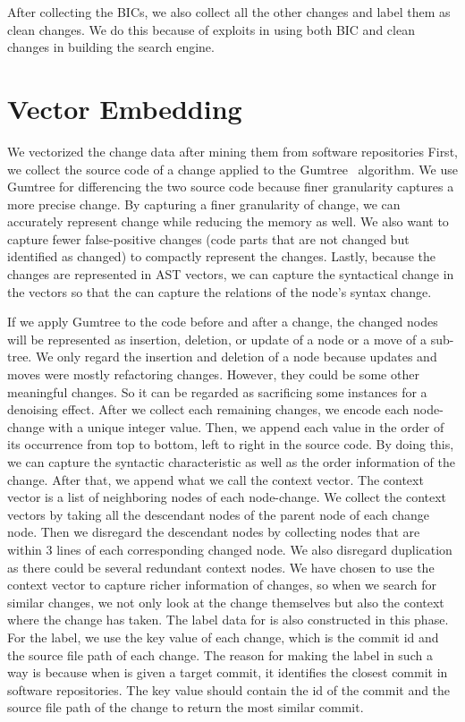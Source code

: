 After collecting the BICs, we also collect all the other changes and label them as clean changes.
We do this because of {\simfin} exploits in using both BIC and clean changes in building the search engine.

\section{Vector Embedding}
We vectorized the change data after mining them from software repositories
First, we collect the source code of a change applied to the Gumtree~\cite{falleri2014fine} algorithm.
We use Gumtree for differencing the two source code because finer granularity captures a more precise change.
By capturing a finer granularity of change, we can accurately represent change while reducing the memory as well.
We also want to capture fewer false-positive changes (code parts that are not changed but identified as changed) to compactly represent the changes.
Lastly, because the changes are represented in AST vectors, we can capture the syntactical change in the vectors so that the {\simfin} can capture the relations of the node's syntax change.

If we apply Gumtree to the code before and after a change, the changed nodes will be represented as insertion, deletion, or update of a node or a move of a sub-tree.
We only regard the  insertion and deletion of a node because updates and moves were mostly refactoring changes.
However, they could be some other meaningful changes.
So it can be regarded as sacrificing some instances for a denoising effect.
After we collect each remaining changes, we encode each node-change with a unique integer value. 
Then, we append each value in the order of its occurrence from top to bottom, left to right in the source code.
By doing this, we can capture the syntactic characteristic as well as the order information of the change.
After that, we append what we call the context vector.
The context vector is a list of neighboring nodes of each node-change.
We collect the context vectors by taking all the descendant nodes of the parent node of each change node.
Then we disregard the descendant nodes by collecting nodes that are within 3 lines of each corresponding changed node.
We also disregard duplication as there could be several redundant context nodes.
We have chosen to use the context vector to capture richer information of changes, so when we search for similar changes, we not only look at the change themselves but also the context where the change has taken.
The label data for {\simfin} is also constructed in this phase.
For the label, we use the key value of each change, which is the commit id and the source file path of each change. 
The reason for making the label in such a way is because when {\simfin} is given a target commit, it identifies the closest commit in software repositories.
The key value should contain the id of the commit and the source file path of the change to return the most similar commit.

